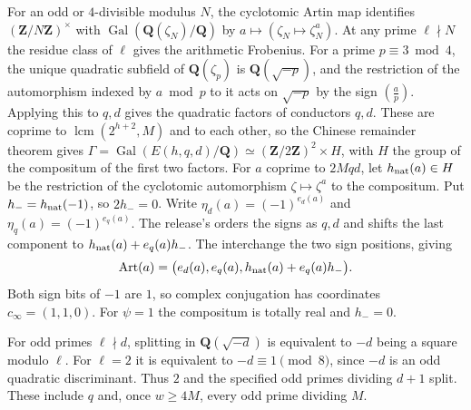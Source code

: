 For an odd or \(4\)-divisible modulus \(N\), the cyclotomic Artin map
identifies \((\mathbf Z/N\mathbf Z)^\times\) with
\(\operatorname{Gal}(\mathbf Q(\zeta_N)/\mathbf Q)\) by
\(a\mapsto(\zeta_N\mapsto\zeta_N^a)\). At any prime \(\ell\nmid N\)
the residue class of \(\ell\) gives the arithmetic Frobenius.
For a prime \(p\equiv3\bmod4\), the unique quadratic subfield of
\(\mathbf Q(\zeta_p)\) is \(\mathbf Q(\sqrt{-p})\), and the
restriction of the automorphism indexed by \(a\bmod p\) to it acts
on \(\sqrt{-p}\) by the sign \((\frac ap)\).
\cite[Ch.~V, Examples~3.1--3.2 and 3.11]{f1milne-cft}
Applying this to \(q,d\) gives the quadratic factors of conductors
\(q,d\). These are coprime to \(\operatorname{lcm}(2^{h+2},M)\) and to
each other, so the Chinese remainder theorem gives
\(\Gamma=\operatorname{Gal}(E(h,q,d)/\mathbf Q)\simeq
(\mathbf Z/2\mathbf Z)^2\times H\), with \(H\) the group of the
compositum of the first two factors.
For \(a\) coprime to \(2Mqd\), let \(h_{\rm nat}(a)\in H\) be the
restriction of the cyclotomic automorphism \(\zeta\mapsto\zeta^a\)
to the compositum. Put \(h_-=h_{\rm nat}(-1)\), so \(2h_-=0\).
Write \(\eta_d(a)=(-1)^{e_d(a)}\) and \(\eta_q(a)=(-1)^{e_q(a)}\).
The release's
orders the signs as \(q,d\) and shifts the last component to
\(h_{\rm nat}(a)+e_q(a)h_-\). The
interchange the two sign positions, giving
\begin{equation}
\label{eq:artin-coordinates}
 \operatorname{Art}(a)
 =\bigl(e_d(a),e_q(a),h_{\rm nat}(a)+e_q(a)h_-\bigr).
\end{equation}
Both sign bits of \(-1\) are \(1\), so complex conjugation has
coordinates \(c_\infty=(1,1,0)\). For \(\psi=1\) the compositum is
totally real and \(h_-=0\).

For odd primes \(\ell\nmid d\), splitting in \(\mathbf Q(\sqrt{-d})\)
is equivalent to \(-d\) being a square modulo \(\ell\). For \(\ell=2\)
it is equivalent to \(-d\equiv1\pmod8\), since \(-d\) is an odd
quadratic discriminant. Thus \(2\) and the specified odd primes
dividing \(d+1\) split. These include \(q\) and, once \(w\ge4M\),
every odd prime dividing \(M\).

